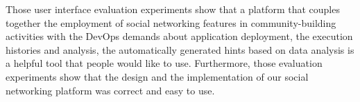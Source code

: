Those user interface evaluation experiments show that a platform that couples together the employment of social networking features in community-building activities with the DevOps demands about application deployment, the execution histories and analysis, the automatically generated hints based on data analysis is a helpful tool that people would like to use. Furthermore, those evaluation experiments show that the design and the implementation of our social networking platform was correct and easy to use.